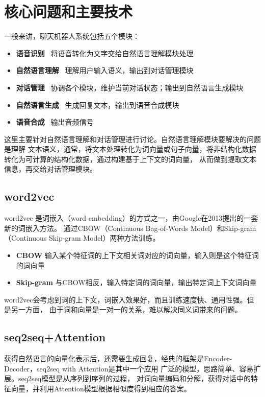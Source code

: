 \documentclass[UTF8]{ctexart}
\begin{document}
\section{核心问题和主要技术}

一般来讲，聊天机器人系统包括五个模块：
\begin{itemize}
    \item \textbf{语音识别} \ 将语音转化为文字交给自然语言理解模块处理
    \item \textbf{自然语言理解} \ 理解用户输入语义，输出到对话管理模块
    \item \textbf{对话管理} \ 协调各个模块，维护当前对话状态；输出到自然语言生成模块
    \item \textbf{自然语言生成} \ 生成回复文本，输出到语音合成模块
    \item \textbf{语音合成} \ 输出音频信号
\end{itemize}

这里主要针对自然语言理解和对话管理进行讨论。自然语言理解模块要解决的问题是理解
文本语义，通常，将文本处理转化为词向量或句子向量，将非结构化数据转化为可计算的结构化数据，通过构建基于上下文的词向量，
从而做到提取文本信息，再交给对话管理模块\cite{杨晔2020基于深度学习的聊天机器人的研究}。

\subsection{word2vec}

word2vec 是词嵌入（word embedding）的方式之一，由Google在2013提出的一套新的词嵌入方法。
通过CBOW（Continuous Bag-of-Words Model）和Skip-gram（Continuous Skip-gram Model）两种方法训练。

\begin{itemize}
    \item \textbf{CBOW} 输入某个特征词的上下文相关词对应的词向量，输入则是这个特征词的词向量
    \item \textbf{Skip-gram} 与CBOW相反，输入特定词的词向量，输出特定词上下文词向量
\end{itemize}

word2vec会考虑到词的上下文，词嵌入效果好，而且训练速度快、通用性强。但是另一方面，
由于词和向量是一对一的关系，难以解决同义词带来的问题。\cite{吴威震2019基于}

\subsection{seq2seq+Attention} 

获得自然语言的向量化表示后，还需要生成回复，经典的框架是Encoder-Decoder，seq2seq with Attention是其中一个应用
广泛的模型，思路简单、容易扩展。seq2seq模型是从序列到序列的过程，
对词向量编码和分解，获得对话中的特征向量，并利用Attention模型根据相似度得到相应的答案。
\end{document}
